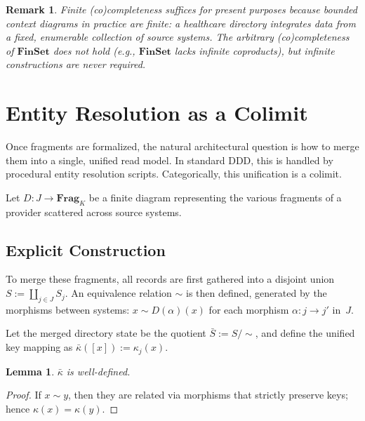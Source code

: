 \documentclass[11pt,a4paper]{article}
\newtheorem{lemma}[definition]{Lemma}
\newtheorem{remark}[definition]{Remark}
\begin{document}
\begin{remark}
\label{rem:finite-suffices}
Finite (co)completeness suffices for present purposes because bounded
context diagrams in practice are finite: a healthcare directory
integrates data from a fixed, enumerable collection of source systems.
The arbitrary (co)completeness of $\mathbf{FinSet}$ does not hold (e.g.,
$\mathbf{FinSet}$ lacks infinite coproducts), but infinite constructions
are never required.
\end{remark}

\section{Entity Resolution as a Colimit}
\label{sec:entity-resolution}

Once fragments are formalized, the natural architectural question is how
to merge them into a single, unified read model. In standard DDD, this
is handled by procedural entity resolution scripts. Categorically, this
unification is a colimit.

Let $D:J\to\mathbf{Frag}_K$ be a finite diagram representing the
various fragments of a provider scattered across source systems.

\subsection{Explicit Construction}
\label{sec:colimit-construction}

To merge these fragments, all records are first gathered into a disjoint
union $S := \coprod_{j\in J} S_j$. An equivalence
relation $\sim$ is then defined, generated by the morphisms between systems:
$x \sim D(\alpha)(x)$ for each morphism $\alpha:j\to j'$ in~$J$.

Let the merged directory state be the quotient $\bar{S} := S/{\sim}$,
and define the unified key mapping as
$\bar{\kappa}([x]) := \kappa_j(x)$.

\begin{lemma}
\label{lem:kappa-welldef}
$\bar{\kappa}$ is well-defined.
\end{lemma}

\begin{proof}
If $x\sim y$, then they are related via morphisms that strictly
preserve keys; hence $\kappa(x)=\kappa(y)$.
\end{proof}
\end{document}
